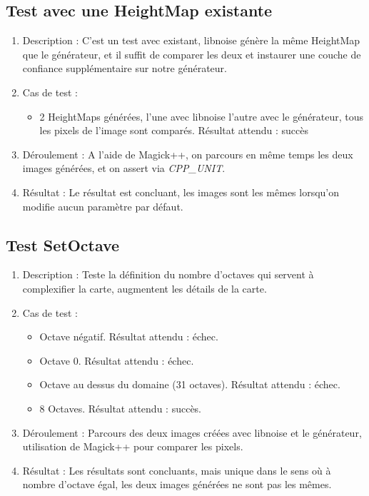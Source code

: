\documentclass[12pt]{report}
\begin{document}
\subsection{Test avec une HeightMap existante}
\begin{enumerate}
    \item Description : C'est un test avec existant, libnoise génère la même HeightMap que le générateur, et il suffit de comparer les deux et instaurer une couche de confiance supplémentaire sur notre générateur.
    \item Cas de test :
    \begin{itemize}
        \item 2 HeightMaps générées, l'une avec libnoise l'autre avec le générateur, tous les pixels de l'image sont comparés. Résultat attendu : succès
    \end{itemize}
    \item Déroulement : A l'aide de Magick++, on parcours en même temps les deux images générées, et on assert via \emph{CPP\_UNIT}.
    \item Résultat : Le résultat est concluant, les images sont les mêmes lorsqu'on modifie aucun paramètre par défaut.
\end{enumerate}

\subsection{Test SetOctave}
\begin{enumerate}
    \item Description : Teste la définition du nombre d'octaves qui servent à complexifier la carte, augmentent les détails de la carte. 
    \item Cas de test :
    \begin{itemize}
        \item Octave négatif. Résultat attendu : échec.
        \item Octave 0. Résultat attendu : échec.
        \item Octave au dessus du domaine (31 octaves). Résultat attendu : échec.
        \item 8 Octaves. Résultat attendu : succès.
    \end{itemize}
    \item Déroulement : Parcours des deux images créées avec libnoise et le générateur, utilisation de Magick++ pour comparer les pixels.
    \item Résultat : Les résultats sont concluants, mais unique dans le sens où à nombre d'octave égal, les deux images générées ne sont pas les mêmes.
\end{enumerate}
\end{document}
